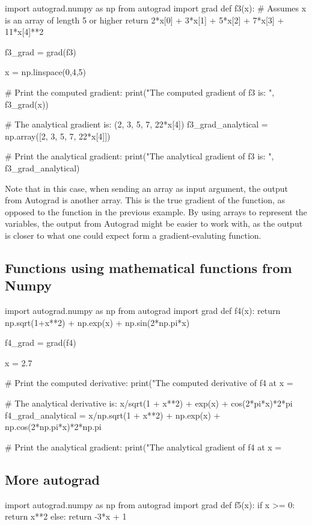 \documentclass[%
oneside,                 %
final,                   %
10pt]{article}
\begin{document}
\bpycod
import autograd.numpy as np
from autograd import grad
def f3(x): # Assumes x is an array of length 5 or higher
    return 2*x[0] + 3*x[1] + 5*x[2] + 7*x[3] + 11*x[4]**2

f3_grad = grad(f3)

x = np.linspace(0,4,5)

# Print the computed gradient:
print("The computed gradient of f3 is: ", f3_grad(x))

# The analytical gradient is: (2, 3, 5, 7, 22*x[4])
f3_grad_analytical = np.array([2, 3, 5, 7, 22*x[4]])

# Print the analytical gradient:
print("The analytical gradient of f3 is: ", f3_grad_analytical)
\epycod

Note that in this case, when sending an array as input argument, the
output from Autograd is another array. This is the true gradient of
the function, as opposed to the function in the previous example. By
using arrays to represent the variables, the output from Autograd
might be easier to work with, as the output is closer to what one
could expect form a gradient-evaluting function.

\subsection{Functions using mathematical functions from Numpy}

\bpycod
import autograd.numpy as np
from autograd import grad
def f4(x):
    return np.sqrt(1+x**2) + np.exp(x) + np.sin(2*np.pi*x)

f4_grad = grad(f4)

x = 2.7

# Print the computed derivative:
print("The computed derivative of f4 at x = %

# The analytical derivative is: x/sqrt(1 + x**2) + exp(x) + cos(2*pi*x)*2*pi
f4_grad_analytical = x/np.sqrt(1 + x**2) + np.exp(x) + np.cos(2*np.pi*x)*2*np.pi

# Print the analytical gradient:
print("The analytical gradient of f4 at x = %
\epycod


\subsection{More autograd}

\bpycod
import autograd.numpy as np
from autograd import grad
def f5(x):
    if x >= 0:
        return x**2
    else:
        return -3*x + 1
\end{document}
